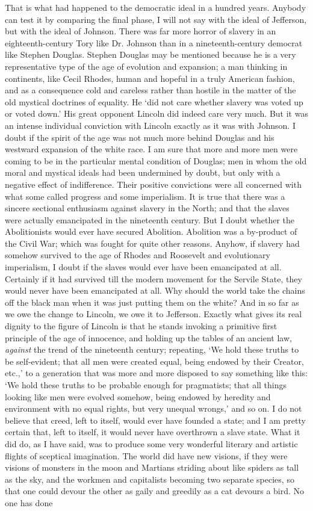 \documentclass{book}
\begin{document}
That is what had happened to the democratic ideal in a hundred years. Anybody can test it by comparing the final phase, I will not say with the ideal of Jefferson, but with the ideal of Johnson. There was far more horror of slavery in an eighteenth-century Tory like Dr. Johnson than in a nineteenth-century democrat like Stephen Douglas. Stephen Douglas may be mentioned because he is a very representative type of the age of evolution and expansion; a man thinking in continents, like Cecil Rhodes, human and hopeful in a truly American fashion, and as a consequence cold and careless rather than hostile in the matter of the old mystical doctrines of equality. He ‘did not care whether slavery was voted up or voted down.’ His great opponent Lincoln did indeed care very much. But it was an intense individual conviction with Lincoln exactly as it was with Johnson. I doubt if the spirit of the age was not much more behind Douglas and his westward expansion of the white race. I am sure that more and more men were coming to be in the particular mental condition of Douglas; men in whom the old moral and mystical ideals had been undermined by doubt, but only with a negative effect of indifference. Their positive convictions were all concerned with what some called progress and some imperialism. It is true that there was a sincere sectional enthusiasm against slavery in the North; and that the slaves were actually emancipated in the nineteenth century. But I doubt whether the Abolitionists would ever have secured Abolition. Abolition was a by-product of the Civil War; which was fought for quite other reasons. Anyhow, if slavery had somehow survived to the age of Rhodes and Roosevelt and evolutionary imperialism, I doubt if the slaves would ever have been emancipated at all. Certainly if it had survived till the modern movement for the Servile State, they would never have been emancipated at all. Why should the world take the chains off the black man when it was just putting them on the white? And in so far as we owe the change to Lincoln, we owe it to Jefferson. Exactly what gives its real dignity to the figure of Lincoln is that he stands invoking a primitive first principle of the age of innocence, and holding up the tables of an ancient law, \emph{against} the trend of the nineteenth century; repeating, ‘We hold these truths to be self-evident; that all men were created equal, being endowed by their Creator, etc.,’ to a generation that was more and more disposed to say something like this: ‘We hold these truths to be probable enough for pragmatists; that all things looking like men were evolved somehow, being endowed by heredity and environment with no equal rights, but very unequal wrongs,’ and so on. I do not believe that creed, left to itself, would ever have founded a state; and I am pretty certain that, left to itself, it would never have overthrown a slave state. What it did do, as I have said, was to produce some very wonderful literary and artistic flights of sceptical imagination. The world did have new visions, if they were visions of monsters in the moon and Martians striding about like spiders as tall as the sky, and the workmen and capitalists becoming two separate species, so that one could devour the other as gaily and greedily as a cat devours a bird. No one has done 
\end{document}
